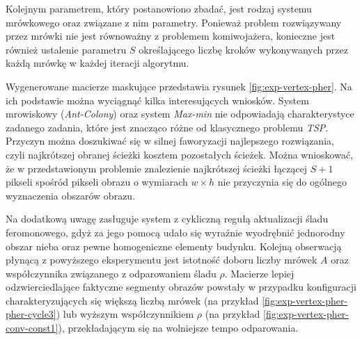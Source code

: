 {{{            %
            Kolejnym parametrem, który postanowiono zbadać, jest rodzaj systemu mrówkowego oraz związane z nim
            parametry. Ponieważ problem rozwiązywany przez mrówki nie jest równoważny z problemem komiwojażera,
            konieczne jest również ustalenie parametru $S$ określającego liczbę kroków wykonywanych przez każdą mrówkę w
            każdej iteracji algorytmu.

            Wygenerowane macierze maskujące przedstawia rysunek \ref{fig:exp-vertex-pher}. Na ich podstawie można
            wyciągnąć kilka interesujących wniosków. System mrowiskowy (\textit{Ant-Colony}) oraz system
            \textit{Max-min} nie odpowiadają charakterystyce zadanego zadania, które jest znacząco różne od klasycznego
            problemu \textit{TSP}. Przyczyn można doszukiwać się w silnej faworyzacji najlepszego rozwiązania, czyli
            najkrótszej obranej ścieżki kosztem pozostałych ścieżek. Można wnioskować, że w przedstawionym problemie
            znalezienie najkrótszej ścieżki łączącej $S + 1$ pikseli spośród pikseli obrazu o wymiarach $w \times h$ nie
            przyczynia się do ogólnego wyznaczenia obszarów obrazu.

            Na dodatkową uwagę zasługuje system z cykliczną regułą aktualizacji śladu feromonowego, gdyż za jego pomocą
            udało się wyraźnie wyodrębnić jednorodny obszar nieba oraz pewne homogeniczne elementy budynku. Kolejną
            obserwacją płynącą z powyższego eksperymentu jest istotność doboru liczby mrówek $A$ oraz współczynnika
            związanego z odparowaniem śladu $\rho$. Macierze lepiej odzwierciedlające faktyczne segmenty obrazów
            powstały w przypadku konfiguracji charakteryzujących się większą liczbą mrówek (na przykład
            \ref{fig:exp-vertex-pher-pher-cycle3}) lub wyższym współczynnikiem $\rho$ (na przykład
            \ref{fig:exp-vertex-pher-conv-const1}), przekładającym się na wolniejsze tempo odparowania.

}}}
